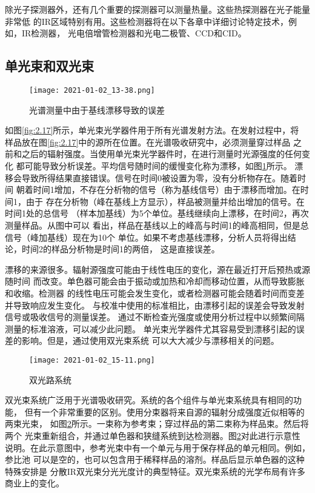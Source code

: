 除光子探测器外，还有几个重要的探测器可以测量热量。这些热探测器在光子能量非常低
的IR区域特别有用。这些检测器将在以下各章中详细讨论特定技术，例如，IR检测器，
光电倍增管检测器和光电二极管、CCD和CID。
\subsection{单光束和双光束}
\begin{figure}[htpb]
    \centering
    \texttt{[image: 2021-01-02\_13-38.png]}
    \caption{光谱测量中由于基线漂移导致的误差}
    \label{fig:2.30}
\end{figure}
如图\ref{fig:2.17}所示，单光束光学器件用于所有光谱发射方法。在发射过程中，将
样品放在图\ref{fig:2.17}中的源所在位置。在光谱吸收研究中，必须测量穿过样品
之前和之后的辐射强度。当使用单光束光学器件时，在进行测量时光源强度的任何变化
都可能导致分析误差。平均信号随时间的缓慢变化称为漂移，如图\ref{fig:2.30}所示。
漂移会导致所得结果直接错误。信号在时间0被设置为零，没有分析物存在。随着时间
朝着时间1增加，不存在分析物的信号（称为基线信号）由于漂移而增加。在时间1，由于
存在分析物（峰在基线上方显示），样品被测量并给出增加的信号。在时间1处的总信号
（样本加基线）为5个单位。基线继续向上漂移，在时间2，再次测量样品。从图中可以
看出，样品在基线以上的峰高与时间1的峰高相同，但是总信号（峰加基线）现在为10个
单位。如果不考虑基线漂移，分析人员将得出结论，时间2的样品分析物是时间1的两倍，
这是直接误差。

漂移的来源很多。辐射源强度可能由于线性电压的变化，源在最近打开后预热或源随时间
而改变。单色器可能会由于振动或加热和冷却而移动位置，从而导致膨胀和收缩。检测器
的线性电压可能会发生变化，或者检测器可能会随着时间而变差并导致响应发生变化。
与校准中使用的标准相比，由漂移引起的误差会导致发射信号或吸收信号的测量误差。
通过不断检查光强度或使用分析过程中以频繁间隔测量的标准溶液，可以减少此问题。
单光束光学器件尤其容易受到漂移引起的误差的影响。但是，通过使用双光束系统
可以大大减少与漂移相关的问题。

\begin{figure}[htpb]
    \centering
    \texttt{[image: 2021-01-02\_15-11.png]}
    \caption{双光路系统}
    \label{fig:2.31}
\end{figure}

双光束系统广泛用于光谱吸收研究。系统的各个组件与单光束系统具有相同的功能，
但有一个非常重要的区别。使用分束器将来自源的辐射分成强度近似相等的两束光束，
如图\ref{fig:2.31}所示。一束称为参考束；穿过样品的第二束称为样品束。然后将两个
光束重新组合，并通过单色器和狭缝系统到达检测器。图\ref{fig:2.31}对此进行示意性
说明。在此示意图中，参考光束中有一个单元与用于保存样品的单元相同。例如，参比池
可以是空的，也可以包含用于稀释样品的溶剂。样品后显示单色器的这种特殊安排是
分散IR双光束分光光度计的典型特征。双光束系统的光学布局有许多商业上的变化。

